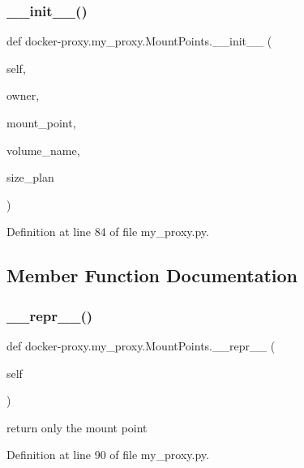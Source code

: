 \subsubsection{\texorpdfstring{\+\_\+\+\_\+init\+\_\+\+\_\+()}{\_\_init\_\_()}}
{\footnotesize\ttfamily def docker-\/proxy.\+my\+\_\+proxy.\+Mount\+Points.\+\_\+\+\_\+init\+\_\+\+\_\+ (\begin{DoxyParamCaption}\item[{}]{self,  }\item[{}]{owner,  }\item[{}]{mount\+\_\+point,  }\item[{}]{volume\+\_\+name,  }\item[{}]{size\+\_\+plan }\end{DoxyParamCaption})}



Definition at line 84 of file my\+\_\+proxy.\+py.



\subsection{Member Function Documentation}
\hypertarget{classdocker-proxy_1_1my__proxy_1_1_mount_points_aea56d9596b2864b4d089b0f34744f3f4}{}\label{classdocker-proxy_1_1my__proxy_1_1_mount_points_aea56d9596b2864b4d089b0f34744f3f4} 
\subsubsection{\texorpdfstring{\+\_\+\+\_\+repr\+\_\+\+\_\+()}{\_\_repr\_\_()}}
{\footnotesize\ttfamily def docker-\/proxy.\+my\+\_\+proxy.\+Mount\+Points.\+\_\+\+\_\+repr\+\_\+\+\_\+ (\begin{DoxyParamCaption}\item[{}]{self }\end{DoxyParamCaption})}

\begin{DoxyVerb}return only the mount point
\end{DoxyVerb}
 

Definition at line 90 of file my\+\_\+proxy.\+py.



